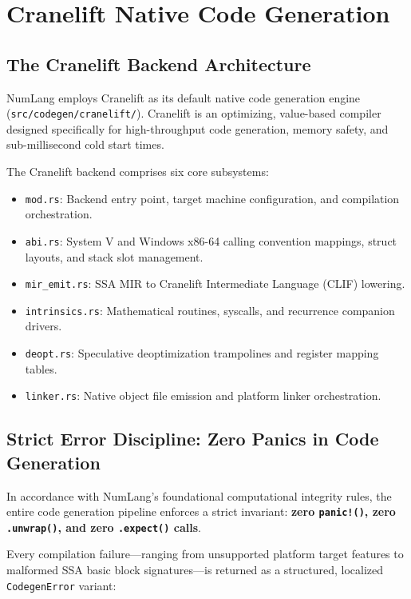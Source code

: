 \chapter{Cranelift Native Code Generation}
\label{chap:cranelift}

\section{The Cranelift Backend Architecture}
\label{sec:cranelift:arch}

NumLang employs Cranelift \citep{cranelift2024} as its default native code generation engine (\texttt{src/codegen/cranelift/}). Cranelift is an optimizing, value-based compiler designed specifically for high-throughput code generation, memory safety, and sub-millisecond cold start times.

The Cranelift backend comprises six core subsystems:
\begin{itemize}
    \item \texttt{mod.rs}: Backend entry point, target machine configuration, and compilation orchestration.
    \item \texttt{abi.rs}: System V and Windows x86-64 calling convention mappings, struct layouts, and stack slot management.
    \item \texttt{mir\_emit.rs}: SSA MIR to Cranelift Intermediate Language (CLIF) lowering.
    \item \texttt{intrinsics.rs}: Mathematical routines, syscalls, and recurrence companion drivers.
    \item \texttt{deopt.rs}: Speculative deoptimization trampolines and register mapping tables.
    \item \texttt{linker.rs}: Native object file emission and platform linker orchestration.
\end{itemize}

\section{Strict Error Discipline: Zero Panics in Code Generation}
\label{sec:cranelift:zero_panic}

In accordance with NumLang's foundational computational integrity rules, the entire code generation pipeline enforces a strict invariant: \textbf{zero \texttt{panic!()}, zero \texttt{.unwrap()}, and zero \texttt{.expect()} calls}.

Every compilation failure---ranging from unsupported platform target features to malformed SSA basic block signatures---is returned as a structured, localized \texttt{CodegenError} variant:

